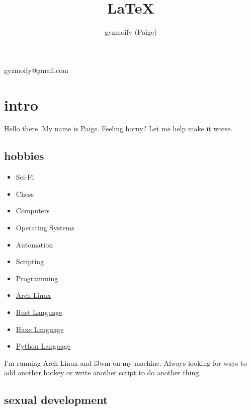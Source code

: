 \documentclass{article}
\makeatletter
\renewcommand{\maketitle}{\begin{center}
{\huge\bfseries
\theauthor}
\vspace{.25em}
gyzmoify@gmail.com
\end{center}
}
\makeatother
\begin{document}
\title{\LaTeX}
\author{gyzmoify (Paige)}

\maketitle

\section{intro}

Hello there.
My name is Paige.
Feeling horny? Let me help make it worse.

\subsection{hobbies}

\begin{itemize}
    \item Sci-Fi
    \item Chess
    \item Computers
    \item Operating Systems
    \item Automation
    \item Scripting
    \item Programming
    \item \href{https://www.archlinux.org/}{Arch Linux}
    \item \href{https://www.rust-lang.org/}{Rust Language}
    \item \href{https://haxe.org/}{Haxe Language}
    \item \href{https://www.python.org/}{Python Language}
\end{itemize}

I'm running Arch Linux and i3wm on my machine.
Always looking for ways to add another hotkey or write another script to do another thing.

\subsection{sexual development}
\end{document}
